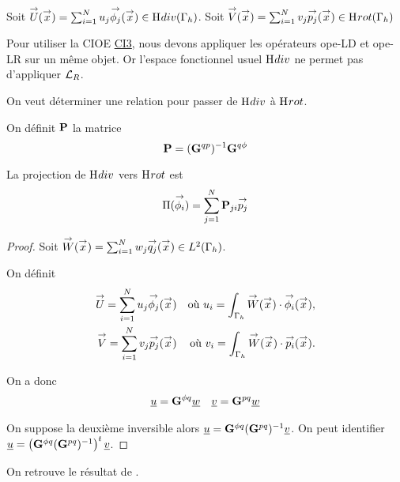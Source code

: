   Soit \(\vect{U}(\vx) = \sum_{i=1}^N u_j \phij(\vx) \in \Hdiv(\Gamma_h)\).
  Soit \(\vect{V}(\vx) = \sum_{i=1}^N v_j \pj(\vx) \in \Hrot(\Gamma_h)\)  

  Pour utiliser la CIOE \hyperlink{ci3}{CI3}, nous devons appliquer les opérateurs \gls{ope-LD} et \gls{ope-LR} sur un même objet. Or l'espace fonctionnel usuel \(\Hdiv\) ne permet pas d'appliquer \(\LR\). 

  On veut déterminer une relation pour passer de \(\Hdiv\) à \(\Hrot\).

  \begin{defn}On définit \(\mPP\) la matrice
  \label{def:eq_int:matrice_changment_mP}
    \begin{equation*}
      \mPP = (\mG{q}{p})^{-1}\mG{q}{\phi}
    \end{equation*}
  \end{defn}

  \begin{prop}La projection de \(\Hdiv\) vers \(\Hrot\) est
    \begin{equation*}
      \Pi(\phii) = \sum_{j=1}^N \mPP_{ji}\pj
    \end{equation*}
  \end{prop}

  \begin{proof}
      Soit \(\vect{W}(\vx) = \sum_{i=1}^N w_j \qj(\vx) \in L^2(\Gamma_h)\).

      On définit
      \begin{align*}
        \vect{U}= \sum_{i=1}^N u_j \phij(\vx) && \text{où~} u_i = \int_{\Gamma_h} \vect{W}(\vx)\cdot\phii(\vx),
        \\
        \vect{V} = \sum_{i=1}^N v_j \pj(\vx) && \text{où~} v_i = \int_{\Gamma_h} \vect{W}(\vx)\cdot\pii(\vx).
      \end{align*}

      On a donc
      \begin{align*}
        \comp{u}=\mG{\phi}{q}\comp{w}
        &&
        \comp{v}=\mG{p}{q}\comp{w}
      \end{align*}

      On suppose la deuxième inversible alors  \(\comp{u} = \mG{\phi}{q} (\mG{p}{q})^{-1} \comp{v}\). On peut identifier \(\comp{u}= \left(\mG{\phi}{q}(\mG{p}{q})^{-1}\right)^{t}\comp{v}\).

    \end{proof}

    On retrouve le résultat de \cite[annexe B]{stupfel_implementation_2015}.%

